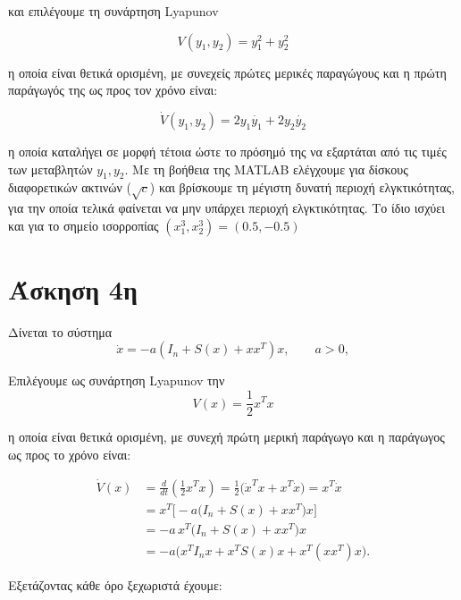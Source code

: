 \documentclass{article}
\begin{document}
\hfill\break
και επιλέγουμε τη συνάρτηση Lyapunov

\begin{equation*}
    V(y_1, y_2) = y_1^2 + y_2^2
\end{equation*}

\hfill\break
η οποία είναι θετικά ορισμένη, με συνεχείς πρώτες μερικές παραγώγους και η πρώτη παράγωγός της ως προς τον χρόνο είναι:

\begin{equation*}
    \dot{V}(y_1, y_2) = 2y_1\dot{y_1} + 2y_2\dot{y_2}
\end{equation*}

\hfill\break
η οποία καταλήγει σε μορφή τέτοια ώστε το πρόσημό της να εξαρτάται από τις τιμές των μεταβλητών \(y_1, y_2\). Με τη βοήθεια της MATLAB ελέγχουμε για δίσκους διαφορετικών ακτινών (\(\sqrt{c}\)) και βρίσκουμε τη μέγιστη δυνατή περιοχή ελγκτικότητας, για την οποία τελικά φαίνεται να μην υπάρχει περιοχή ελγκτικότητας. Το ίδιο ισχύει και για το σημείο ισορροπίας \((x_1^3, x_2^3) = (0.5, -0.5)\)

\section{Άσκηση 4η}
Δίνεται το σύστημα
\begin{equation*}
    \dot x = -a(I_n + S(x) + x x^T)x,\qquad a>0,
\end{equation*}

\hfill\break
Επιλέγουμε ως συνάρτηση Lyapunov την
\begin{equation*}
    V(x)=\frac{1}{2}x^Tx
\end{equation*}

\hfill\break
η οποία είναι θετικά ορισμένη, με συνεχή πρώτη μερική παράγωγο και η παράγωγος ως προς το χρόνο είναι:

\begin{align*}
    \dot V(x)
    &= \frac{d}{dt}\!\left(\tfrac{1}{2}x^{T}x\right)
    = \tfrac{1}{2}\big(\dot x^{T}x + x^{T}\dot x\big)
    = x^{T}\dot x \\
    &= x^{T}\Big[-a\big(I_n + S(x) + x x^{T}\big)x\Big] \\
    &= -a\,x^{T}\big(I_n + S(x) + x x^{T}\big)x \\
    &= -a\big(x^{T}I_n x + x^{T}S(x)x + x^{T}(x x^{T})x\big).
\end{align*}

\hfill\break
Εξετάζοντας κάθε όρο ξεχωριστά έχουμε: 
\end{document}
